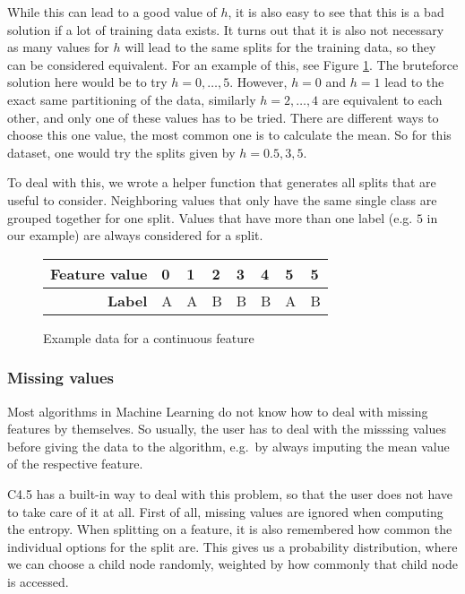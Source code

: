 \documentclass[a4paper]{article}
\begin{document}
While this can lead to a good value of $h$, it is also easy to see that this is a bad solution if a lot of training data exists. It turns out that it is also not necessary as many values for $h$ will lead to the same splits for the training data, so they can be considered equivalent. For an example of this, see Figure \ref{fig:continuous-feature}. The bruteforce solution here would be to try $h = 0, \dots, 5$. However, $h = 0$ and $h = 1$ lead to the exact same partitioning of the data, similarly $h = 2, \dots, 4$ are equivalent to each other, and only one of these values has to be tried. There are different ways to choose this one value, the most common one is to calculate the mean. So for this dataset, one would try the splits given by $h = 0.5, 3, 5$.

To deal with this, we wrote a helper function that generates all splits that are useful to consider. Neighboring values that only have the same single class are grouped together for one split. Values that have more than one label (e.g. $5$ in our example) are always considered for a split.

\begin{figure}
	\centering
  \begin{tabular}{r|l|l|l|l|l|l|l}
      \textbf{Feature value} & 0 & 1 & 2 & 3 & 4 & 5 & 5 \\
      \hline
      \textbf{Label} & A & A & B & B & B & A & B
  \end{tabular}

  \caption{Example data for a continuous feature}
  \label{fig:continuous-feature}
\end{figure}

\subsubsection{Missing values}

Most algorithms in Machine Learning do not know how to deal with missing features by themselves. So usually, the user has to deal with the misssing values before giving the data to the algorithm, e.g.\ by always imputing the mean value of the respective feature.

C4.5 has a built-in way to deal with this problem, so that the user does not have to take care of it at all. First of all, missing values are ignored when computing the entropy. When splitting on a feature, it is also remembered how common the individual options for the split are. This gives us a probability distribution, where we can choose a child node randomly, weighted by how commonly that child node is accessed.
\end{document}
